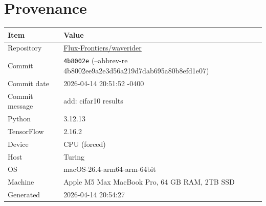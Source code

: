 \documentclass[11pt,letterpaper]{article}
\begin{document}
\section{Provenance}

\begin{tabular}{@{}ll@{}}
\toprule
\textbf{Item} & \textbf{Value} \\
\midrule
  Repository & \href{https://github.com/Flux-Frontiers/waverider}{Flux-Frontiers/waverider} \\
  Commit & \texttt{4b8002e} (--abbrev-re
4b8002ee9a2e3d56a219d7dab695a80b8efd1e07) \\
  Commit date & 2026-04-14 20:51:52 -0400 \\
  Commit message & add: cifar10 results \\
  Python & 3.12.13 \\
  TensorFlow & 2.16.2 \\
  Device & CPU (forced) \\
  Host & Turing \\
  OS & macOS-26.4-arm64-arm-64bit \\
  Machine & Apple M5 Max MacBook Pro, 64 GB RAM, 2TB SSD \\
  Generated & 2026-04-14 20:54:27 \\
\bottomrule
\end{tabular}
\end{document}
